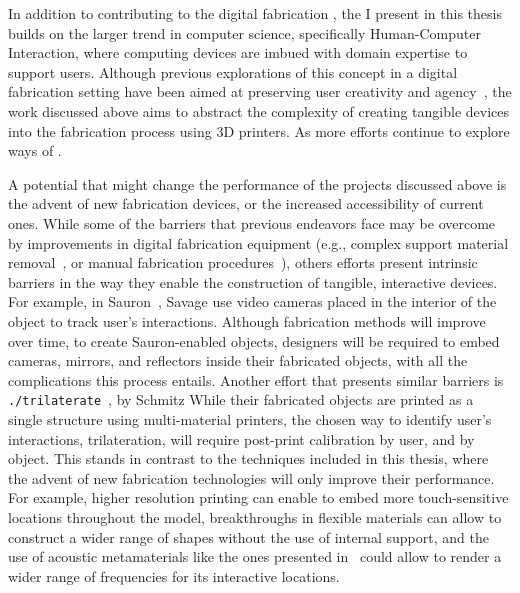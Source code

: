    In addition to contributing to the digital fabrication , the I
    present in this thesis builds on the larger trend in computer science,
    specifically Human-Computer Interaction, where computing devices are imbued
    with domain expertise to support users. Although previous explorations of
    this concept in a digital fabrication setting have been aimed at preserving
    user creativity and agency~\cite{Zoran:2013}, the work discussed above aims
    to abstract the complexity of creating tangible devices into the fabrication
    process using 3D printers. As more efforts continue to explore ways of
    .

    A potential  that might change the performance of the
    projects discussed above is the advent of new fabrication devices, or the
    increased accessibility of current ones.  While some of the barriers that
    previous endeavors face may be overcome by improvements in digital
    fabrication equipment (e.g., complex support material
    removal~\cite{Laput:2015}, or manual fabrication procedures~\cite{He:2017}),
    others efforts present intrinsic barriers in the way they enable the
    construction of tangible, interactive devices. For example, in
    Sauron~\cite{Savage:2013}, Savage \etal use video cameras placed in the
    interior of the object to track user's interactions.  Although fabrication
    methods will improve over time, to create Sauron-enabled objects, designers
    will be required to embed cameras, mirrors, and reflectors inside their
    fabricated objects, with all the complications this process entails. Another
    effort that presents similar barriers is
    \texttt{./trilaterate}~\cite{Schmitz:2019}, by Schmitz \etal While their
    fabricated objects are printed as a single structure using multi-material
    printers, the chosen way to identify user's interactions, trilateration,
    will require post-print calibration by user, and by object. This stands in
    contrast to the techniques included in this thesis, where the advent of new
    fabrication technologies will only improve their performance. For example,
    higher resolution printing can enable \at to embed more touch-sensitive
    locations throughout the model, breakthroughs in flexible materials can
    allow \mp to construct a wider range of shapes without the use of internal
    support, and the use of acoustic metamaterials like the ones presented
    in~\cite{Haberman:2016} could allow \bh to render a wider range of
    frequencies for its interactive locations.

